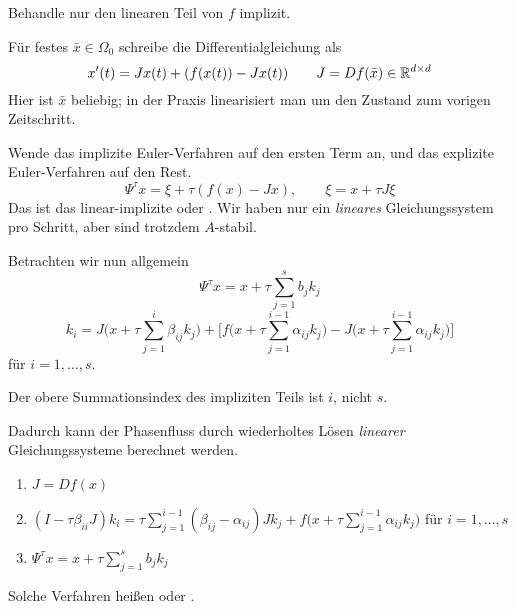 \begin{idea}
	Behandle nur den linearen Teil von $f$ implizit.
\end{idea}

Für festes $\bar{x} \in \Omega_0$ schreibe die Differentialgleichung als
\begin{equation*}
	x'(t) = Jx(t) + (f(x(t)) - Jx(t)) \qquad J=Df(\bar{x})\in\mathbb R^{d\times d}
\end{equation*}
Hier ist $\bar{x}$ beliebig; in der Praxis linearisiert man um den Zustand
zum vorigen Zeitschritt.

Wende das implizite Euler-Verfahren auf den ersten Term an, und das explizite Euler-Verfahren auf den Rest.
\begin{equation*}
\Psi^\tau x = \xi + \tau(f(x)-Jx),\qquad \xi = x+\tau J\xi
\end{equation*}
Das ist das linear-implizite oder .
Wir haben nur ein \textit{lineares} Gleichungssystem pro Schritt, aber sind trotzdem $A$-stabil.

Betrachten wir nun allgemein 
\begin{equation*}
\Psi^\tau x = x + \tau \sum_{j=1}^s b_j k_j
\end{equation*}
\begin{equation*}
k_i = J\Big(x+\tau\sum_{j=1}^i \beta_{ij} k_j\Big)
+ \bigg[ f\Big(x+\tau\sum_{j=1}^{i-1} \alpha_{ij} k_j\Big)
- J\Big(x+\tau\sum_{j=1}^{i-1} \alpha_{ij} k_j\Big)\bigg]
\end{equation*}
für $i=1,\dots,s$.

\begin{hinw}
	Der obere Summationsindex des impliziten Teils ist $i$, nicht $s$.
\end{hinw}

Dadurch kann der Phasenfluss durch wiederholtes Lösen \textit{linearer} Gleichungssysteme berechnet werden.
\begin{enumerate}
	\item $J = Df(x)$
	\item $\displaystyle (I-\tau\beta_{ii}J)k_i = \tau\sum_{j=1}^{i-1}(\beta_{ij}-\alpha_{ij})Jk_j + f\Big(x + \tau\sum_{j=1}^{i-1} \alpha_{ij} k_j\Big)$ für $i=1,\dots,s$
	\item $\displaystyle \Psi^\tau x = x + \tau\sum_{j=1}^{s} b_j k_j$
\end{enumerate}
Solche Verfahren heißen  oder .



